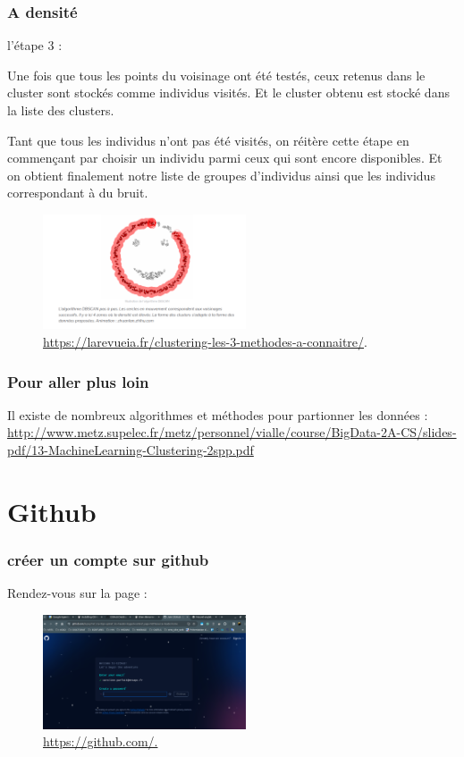 \begin{frame}
  \frametitle{A densité}
l'étape 3 : 

Une fois que tous les points du voisinage ont été testés, ceux retenus dans le cluster sont stockés comme individus visités. Et le cluster obtenu est stocké dans la liste des clusters.

Tant que tous les individus n’ont pas été visités, on réitère cette étape en commençant par choisir un individu parmi ceux qui sont encore disponibles. Et on obtient finalement notre liste de groupes d’individus ainsi que les individus correspondant à du bruit. 
\begin{figure}
  \includegraphics[width=6cm]{images/cluster_densite.png}
  \caption{\url{https://larevueia.fr/clustering-les-3-methodes-a-connaitre/}.}
  \end{figure}


\end{frame}

\begin{frame}
  \frametitle{Pour aller plus loin}

Il existe de nombreux algorithmes et méthodes pour partionner les données :
\url{http://www.metz.supelec.fr/metz/personnel/vialle/course/BigData-2A-CS/slides-pdf/13-MachineLearning-Clustering-2spp.pdf}

  
\end{frame}


\section{Github}
\begin{frame}
  \frametitle{créer un compte sur github}

Rendez-vous sur la page : 
\begin{figure}
\caption{\url{https://github.com/.}}
  \includegraphics[width=6cm]{images/github_inscription.png}
  
  \end{figure}
  
\end{frame}

